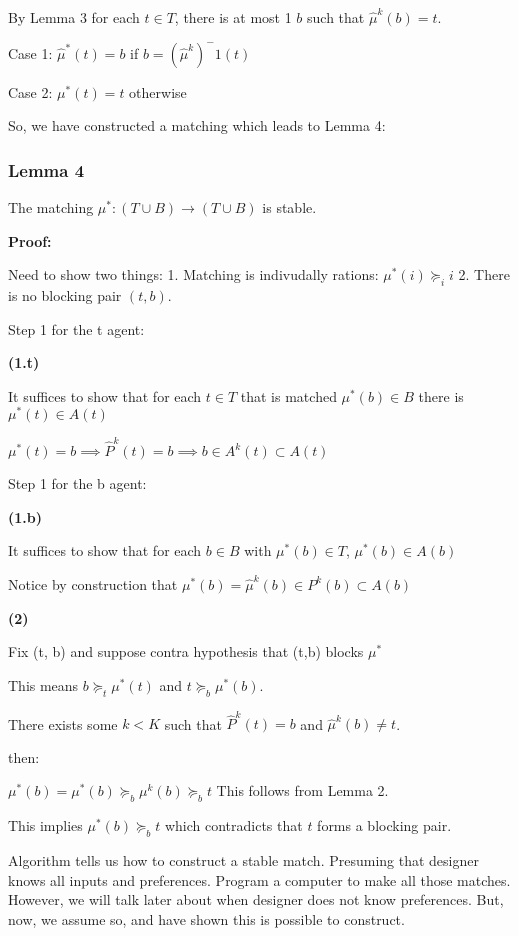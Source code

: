 \documentclass[11pt]{article}
\begin{document}
By Lemma 3 for each \(t \in T\), there is at most 1 \(b\) such that
\(\hat{\mu}^k(b) = t\).

Case 1: \(\hat{\mu}^*(t) = b\) if \(b = (\hat{\mu}^k)^-1(t)\)

Case 2: \(\mu^*(t) = t\) otherwise

    So, we have constructed a matching which leads to Lemma 4:

\subsubsection{Lemma 4}\label{lemma-4}

The matching \(\mu^*: (T \cup B) \rightarrow (T \cup B)\) is stable.

\textbf{Proof:}

Need to show two things: 1. Matching is indivudally rations:
\(\mu^*(i) \succeq_i i\) 2. There is no blocking pair \((t,b)\).

Step 1 for the t agent:

\textbf{(1.t)}

It suffices to show that for each \(t \in T\) that is matched
\(\mu^*(b) \in B\) there is \(\mu^*(t) \in A(t)\)

\(\mu^*(t) = b \implies \hat{P}^k(t) = b \implies b \in A^k(t) \subset A(t)\)

Step 1 for the b agent:

\textbf{(1.b)}

It suffices to show that for each \(b \in B\) with \(\mu^*(b) \in T\),
\(\mu^*(b) \in A(b)\)

Notice by construction that
\(\mu^*(b) = \hat{\mu}^k(b) \in P^k(b) \subset A(b)\)

    \textbf{(2)}

Fix (t, b) and suppose contra hypothesis that (t,b) blocks \(\mu^*\)

This means \(b \succeq_t \mu^*(t)\) and \(t \succeq_b \mu^*(b)\).

There exists some \(k < K\) such that \(\hat{P}^k(t) = b\) and
\(\hat{\mu}^k(b) \ne t\).

then:

\(\mu^*(b) = \mu^*(b) \succeq_b \mu^k(b) \succeq_b t\) This follows from
Lemma 2.

This implies \(\mu^*(b) \succeq_b t\) which contradicts that \(t\) forms
a blocking pair.

    Algorithm tells us how to construct a stable match. Presuming that
designer knows all inputs and preferences. Program a computer to make
all those matches. However, we will talk later about when designer does
not know preferences. But, now, we assume so, and have shown this is
possible to construct.
\end{document}
